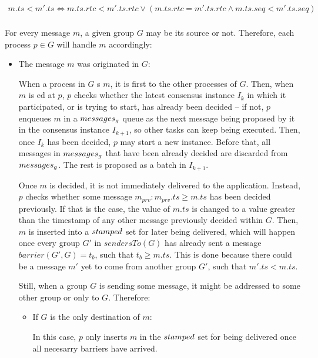 \documentclass[times, 10pt]{article}
\begin{document}
\begin{align*}
m.ts < m'.ts \Longleftrightarrow m.ts.rtc < m'.ts.rtc \vee (m.ts.rtc = m'.ts.rtc \wedge m.ts.seq < m'.ts.seq)\\
\end{align*}

For every message $m$, a given group $G$ may be its source or not. Therefore, each process $p \in G$ will handle $m$ accordingly:

\begin{itemize}
  \item The message $m$ was originated in $G$:
  
  When a process in $G$ \amcast{}s $m$, it is first \rmcast{} to the other processes of $G$. Then, when $m$ is \rmdel{}ed at $p$, $p$ checks whether the latest consensus instance $I_{k}$ in which it participated, or is trying to start, has already been decided -- if not, $p$ enqueues $m$ in a $messages\text{$_g$}$ queue as the next message being proposed by it in the consensus instance $I_{k+1}$, so other tasks can keep being executed. Then, once $I_{k}$ has been decided, $p$ may start a new instance. Before that, all messages in $messages\text{$_g$}$ that have been already decided are discarded from $messages\text{$_g$}$. The rest is proposed as a batch in $I_{k+1}$.
  
  Once $m$ is decided, it is not immediately delivered to the application. Instead, $p$ checks whether some message $m_{prv} : m_{prv}.ts \geq m.ts$ has been decided previously. If that is the case, the value of $m.ts$ is changed to a value greater than the timestamp of any other message previously decided within $G$. Then, $m$ is inserted into a $stamped$ set for later being delivered, which will happen once every group $G'$ in $sendersTo(G)$ has already sent a message $barrier(G',G) = t_b$, such that $t_b \geq m.ts$. This is done because there could be a message $m'$ yet to come from another group $G'$, such that $m'.ts < m.ts$.
  
  Still, when a group $G$ is sending some message, it might be addressed to some other group or only to $G$. Therefore:
  
  \begin{itemize}
    \item If $G$ is the only destination of $m$:
    
    In this case, $p$ only inserts $m$ in the $stamped$ set for being delivered once all necesarry barriers have arrived.
    

\end{itemize}
\end{itemize}
\end{document}
